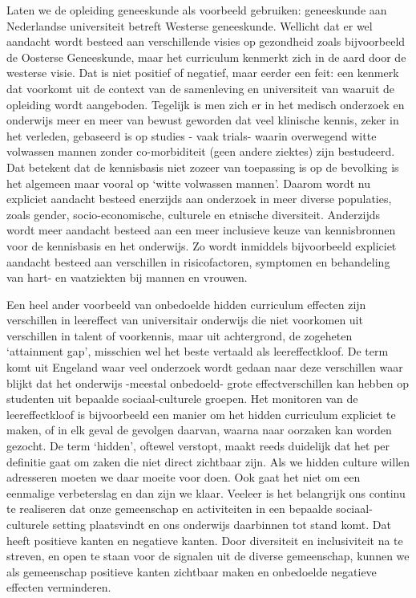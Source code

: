 \documentclass[empirical, authordate, ]{new-jote-article}
\begin{document}
	Laten we de opleiding geneeskunde als voorbeeld gebruiken: geneeskunde aan Nederlandse universiteit betreft Westerse geneeskunde. Wellicht dat er wel aandacht wordt besteed aan verschillende visies op gezondheid zoals bijvoorbeeld de Oosterse Geneeskunde, maar het curriculum kenmerkt zich in de aard door de westerse visie. Dat is niet positief of negatief, maar eerder een feit: een kenmerk dat voorkomt uit de context van de samenleving en universiteit van waaruit de opleiding wordt aangeboden. Tegelijk is men zich er in het medisch onderzoek en onderwijs meer en meer van bewust geworden dat veel klinische kennis, zeker in het verleden, gebaseerd is op studies - vaak trials- waarin overwegend witte volwassen mannen zonder co-morbiditeit (geen andere ziektes) zijn bestudeerd. Dat betekent dat de kennisbasis niet zozeer van toepassing is op de bevolking is het algemeen maar vooral op ‘witte volwassen mannen'. Daarom wordt nu expliciet aandacht besteed enerzijds aan onderzoek in meer diverse populaties, zoals gender, socio-economische, culturele en etnische diversiteit. Anderzijds wordt meer aandacht besteed aan een meer inclusieve keuze van kennisbronnen voor de kennisbasis en het onderwijs. Zo wordt inmiddels bijvoorbeeld expliciet aandacht besteed aan verschillen in risicofactoren, symptomen en behandeling van hart- en vaatziekten bij mannen en vrouwen.



	Een heel ander voorbeeld van onbedoelde hidden curriculum effecten zijn verschillen in leereffect van universitair onderwijs die niet voorkomen uit verschillen in talent of voorkennis, maar uit achtergrond, de zogeheten ‘attainment gap', misschien wel het beste vertaald als leereffectkloof. De term komt uit Engeland waar veel onderzoek wordt gedaan naar deze verschillen waar blijkt dat het onderwijs -meestal onbedoeld- grote effectverschillen kan hebben op studenten uit bepaalde sociaal-culturele groepen. Het monitoren van de leereffectkloof is bijvoorbeeld een manier om het hidden curriculum expliciet te maken, of in elk geval de gevolgen daarvan, waarna naar oorzaken kan worden gezocht. De term ‘hidden', oftewel verstopt, maakt reeds duidelijk dat het per definitie gaat om zaken die niet direct zichtbaar zijn. Als we hidden culture willen adresseren moeten we daar moeite voor doen. Ook gaat het niet om een eenmalige verbeterslag en dan zijn we klaar. Veeleer is het belangrijk ons continu te realiseren dat onze gemeenschap en activiteiten in een bepaalde sociaal-culturele setting plaatsvindt en ons onderwijs daarbinnen tot stand komt. Dat heeft positieve kanten en negatieve kanten. Door diversiteit en inclusiviteit na te streven, en open te staan voor de signalen uit de diverse gemeenschap, kunnen we als gemeenschap positieve kanten zichtbaar maken en onbedoelde negatieve effecten verminderen.
\end{document}
